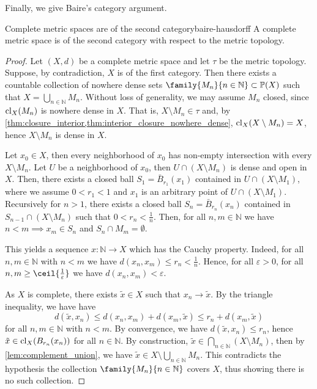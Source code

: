 Finally, we give Baire's category argument.
\begin{theorem}{Complete metric spaces are of the second category}{baire-hausdorff}
    A complete metric space is of the second category with respect to the metric topology.
\end{theorem}
\begin{proof}
    Let \((X, d)\) be a complete metric space and let \(\tau\) be the metric topology. Suppose, by contradiction, \(X\) is of the first category. Then there exists a countable collection of nowhere dense sets \(\family{M_n}{n \in \mathbb{N}} \subset \mathbb{P}(X)\) such that \(X = \bigcup_{n \in \mathbb{N}} M_n\). Without loss of generality, we may assume \(M_n\) closed, since \(\operatorname{cl}_X(M_n)\) is nowhere dense in \(X\). That is, \(X \setminus M_n \in \tau\) and, by \cref{thm:closure_interior,thm:interior_closure_nowhere_dense}, \(\operatorname{cl}_X(X \setminus M_n) = X\), hence \(X \setminus M_n\) is dense in \(X\).

    Let \(x_0 \in X\), then every neighborhood of \(x_0\) has non-empty intersection with every \(X\setminus M_n\). Let \(U\) be a neighborhood of \(x_0\), then \(U \cap (X\setminus M_n)\) is dense and open in \(X\). Then, there exists a closed ball \(S_1 = \bar{B}_{r_1}(x_1)\) contained in \(U \cap (X \setminus M_1)\), where we assume \(0 < r_1 < 1\) and \(x_1\) is an arbitrary point of \(U \cap (X \setminus M_1)\). Recursively for \(n > 1\), there exists a closed ball \(S_n = \bar{B}_{r_n}(x_n)\) contained in \(S_{n-1} \cap (X \setminus M_n)\) such that \(0 < r_n < \frac1n\). Then, for all \(n,m \in \mathbb{N}\) we have \(n < m \implies x_m \in S_n\) and \(S_n \cap M_m = \emptyset\).

    This yields a sequence \(x : \mathbb{N} \to X\) which has the Cauchy property. Indeed, for all \(n,m \in \mathbb{N}\) with \(n < m\) we have \(d(x_n, x_m) \leq r_n < \frac1n\). Hence, for all \(\varepsilon > 0\), for all \(n,m \geq \ceil{\frac{1}{\varepsilon}}\) we have \(d(x_n,x_m) < \varepsilon\).


    As \(X\) is complete, there exists \(\tilde{x} \in X\) such that \(x_n \to \tilde{x}\). By the triangle inequality, we have have
    \begin{equation*}
        d(\tilde{x}, x_n) \leq d(x_n, x_m) + d(x_m, \tilde{x}) \leq r_n + d(x_m, \tilde{x})
    \end{equation*}
    for all \(n,m \in \mathbb{N}\) with \(n < m\). By convergence, we have \(d(\tilde{x}, x_n) \leq r_n\), hence \(\tilde{x} \in \operatorname{cl}_X(B_{r_n}(x_n))\) for all \(n\in \mathbb{N}\). By construction, \(\tilde{x} \in \bigcap_{n\in \mathbb{N}} (X\setminus M_n)\), then by \cref{lem:complement_union}, we have \(\tilde{x} \in X \setminus \bigcup_{n\in \mathbb{N}} M_n\). This contradicts the hypothesis the collection \(\family{M_n}{n\in \mathbb{N}}\) covers \(X\), thus showing there is no such collection.
\end{proof}
